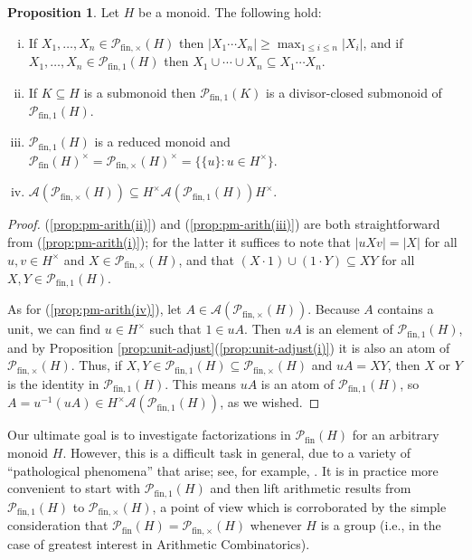 \documentclass{report}
\renewcommand{\P}{\mathcal{P}}
\newcommand{\fin}{\textrm{fin}}
\newcommand{\funt}{{\textrm{fin}, \times}}
\newcommand{\fun}{{\textrm{fin}, 1}}
\renewcommand{\:}{\text{:}}
\theoremstyle{definition}
\newtheorem{prop}[defn]{Proposition}
\begin{document}
\begin{prop}\label{prop:pm-arith}
Let $H$ be a monoid. The following hold:
	\begin{enumerate}[(i)]
	\item\label{prop:pm-arith(i)} If $X_1,\ldots,X_n\in \P_{\fin,\times}(H)$ then $|X_1 \cdots X_n| \ge \max_{1 \le i \le n} |X_i|$, and if $X_1,\ldots,X_n\in \P_{\fin,1}(H)$ then $X_1 \cup \cdots \cup X_n \subseteq X_1 \cdots X_n$.
	\item\label{prop:pm-arith(ii)} If $K\subseteq H$ is a submonoid then $\P_\fun(K)$ is a divisor-closed submonoid of $\P_\fun(H)$.
	\item \label{prop:pm-arith(iii)} $\P_\fun(H)$ is a reduced monoid and $\P_\fin(H)^\times=\P_\funt(H)^\times = \bigl\{ \{u\}: u\in H^\times\bigr\}$.
	\item \label{prop:pm-arith(iv)} $\mathscr{A}(\mathcal P_{\funt}(H)) \subseteq H^\times \mathscr{A}(\mathcal P_{\fun}(H)) H^\times$.
	\end{enumerate}
\end{prop}
%
\begin{proof}
(\ref{prop:pm-arith(ii)}) and (\ref{prop:pm-arith(iii)}) are both straightforward from (\ref{prop:pm-arith(i)}); for the latter it suffices to note that $|uXv| = |X|$ for all $u, v \in H^\times$ and $X \in \mathcal P_{\fin,\times}(H)$, and that $(X \cdot 1) \cup (1 \cdot Y) \subseteq XY$ for all $X, Y \in \mathcal P_\fun(H)$.

As for (\ref{prop:pm-arith(iv)}), let $A\in \mathscr{A}(\P_\funt(H))$.
	Because $A$ contains a unit, we can find $u\in H^\times$ such that $1\in uA$.
	Then $uA$ is an element of $\P_\fun(H)$, and by Proposition \ref{prop:unit-adjust}(\ref{prop:unit-adjust(i)}) it is also an atom of $\P_\funt(H)$.
	Thus, if $X,Y\in \P_\fun(H) \subseteq \P_\funt(H)$ and $uA = XY$, then $X$ or $Y$ is the identity in $\P_\fun(H)$.
	This means $uA$ is an atom of $\P_\fun(H)$, so $A=u^{-1}(uA)\in H^\times \mathscr{A}(\P_\fun(H))$, as we wished.
\end{proof}
%
%
Our ultimate goal is to investigate factorizations in $\P_\fin(H)$ for an arbitrary monoid $H$. However, this is a difficult task in general, due to a variety of ``pathological phenomena'' that arise; see, for example, \cite[Remark 3.6]{fan-tringali18}. %
It is in practice more convenient to start with $\P_\fun(H)$ and then lift arithmetic results from $\P_\fun(H)$ to $\P_\funt(H)$, a point of view which is corroborated by the simple consideration that $\P_\fin(H) = \P_\funt(H)$ whenever $H$ is a group (i.e., in the case of greatest interest in Arithmetic Combinatorics).
\end{document}
